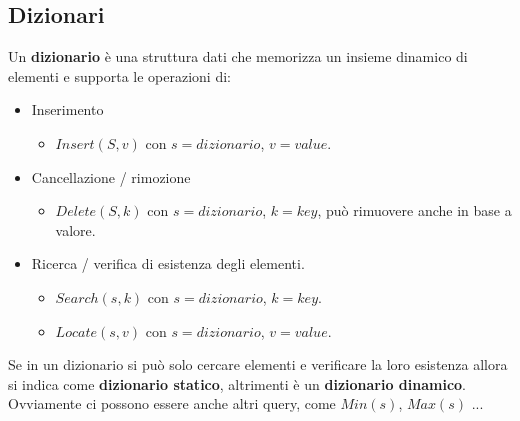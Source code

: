 \documentclass[a4paper,12pt]{article}
\begin{document}
\subsection{Dizionari}
Un \textbf{dizionario} è una struttura dati che memorizza un insieme dinamico di elementi e supporta le operazioni di:
\begin{itemize}
    \item Inserimento
    \begin{itemize}
        \item $Insert(S,v)$ con $s = dizionario$, $v = value$.
    \end{itemize}
    \item Cancellazione / rimozione
    \begin{itemize}
        \item $Delete(S,k)$ con $s = dizionario$, $k = key$, può rimuovere anche in base a valore.
    \end{itemize}
    \item Ricerca / verifica di esistenza degli elementi.
    \begin{itemize}
        \item $Search(s,k)$ con $s = dizionario$, $k = key$.
        \item $Locate(s,v)$ con $s = dizionario$, $v = value$.
    \end{itemize}
\end{itemize}
Se in un dizionario si può solo cercare elementi e verificare la loro esistenza allora si indica come \textbf{dizionario statico}, altrimenti è un \textbf{dizionario dinamico}.\\
Ovviamente ci possono essere anche altri query, come $Min(s)$, $Max(s)$ ...
\end{document}

